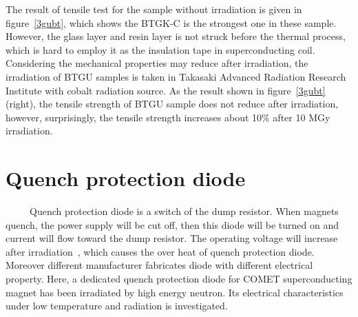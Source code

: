 The result of tensile test for the sample without irradiation is given in figure~\ref{3gubt}, which shows the BTGK-C is the strongest one in these sample.
However, the glass layer and resin layer is not struck before the thermal process, which is hard to employ it as the insulation tape in superconducting coil.
Considering the mechanical properties may reduce after irradiation, the irradiation of BTGU samples is taken in Takasaki Advanced Radiation Research Institute with cobalt radiation source.
As the result shown in figure~\ref{3gubt} (right), the tensile strength of BTGU sample does not reduce after irradiation, however, surprisingly, the tensile strength increases about 10\% after 10 MGy irradiation.



 \section{Quench protection diode}
~~~~~Quench protection diode is a switch of the dump resistor.
When magnets quench, the power supply will be cut off, then this diode will be turned on and current will flow toward the dump resistor.
The operating voltage will increase after irradiation~\cite{hagedorn}, which causes the over heat of quench protection diode.
Moreover different manufacturer fabricates diode with different electrical property.
Here, a dedicated quench protection diode for COMET superconducting magnet has been irradiated by high energy neutron.
Its electrical characteristics under low temperature and radiation is investigated.

